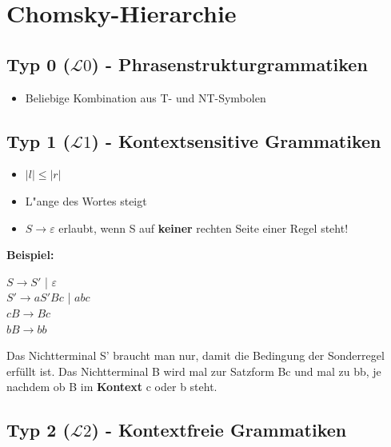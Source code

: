 \documentclass[11pt, a4paper]{scrartcl}
\begin{document}
\newpage


\section{Chomsky-Hierarchie}

\vspace{0.5em}

\subsection{Typ 0 ($\mathcal{L}0$) - Phrasenstrukturgrammatiken}

\begin{itemize}
    \item Beliebige Kombination aus T- und NT-Symbolen
\end{itemize}

\vspace{0.5em}

\subsection{ Typ 1 ($\mathcal{L}1$) - Kontextsensitive Grammatiken}

\begin{itemize}
    \item $|l|\leq|r|$
    \item L"ange des Wortes steigt
    \item $S\rightarrow\varepsilon$ erlaubt, wenn S auf \textbf{keiner} rechten Seite einer Regel steht!
\end{itemize}

\raggedright
\textbf{Beispiel:}

$S \rightarrow S'$ | $\varepsilon$ \\
$S' \rightarrow aS'Bc$ | $abc$ \\
$cB \rightarrow Bc$ \\
$bB \rightarrow bb$ 

\vspace{0.5em}

Das Nichtterminal S' braucht man nur, damit die Bedingung der Sonderregel erfüllt ist. 
Das Nichtterminal B wird mal zur Satzform Bc und mal zu bb, je nachdem ob B im \textbf{Kontext} c oder b steht. 

\vspace{0.5em}

\subsection{Typ 2 ($\mathcal{L}2$) - Kontextfreie Grammatiken}
\end{document}
